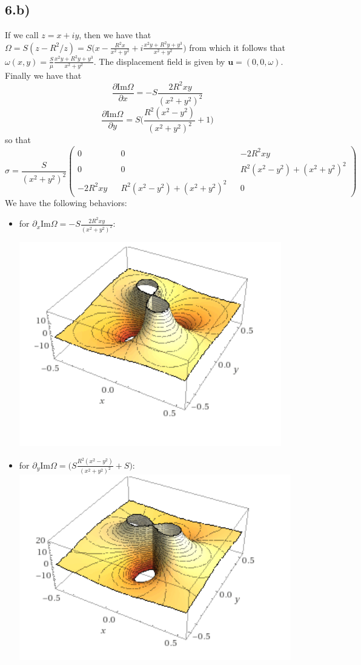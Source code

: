 \documentclass[10pt,a4paper]{book}
\begin{document}
\subsection*{6.b)}
If we call $z=x+iy$, then we have that $\Omega=S(z-R^2/z)=S\bigg(x-\frac{R^2x}{x^2+y^2}+i\frac{x^2y+R^2y+y^3}{x^2+y^2}\bigg)$ from which it follows that $\omega(x,y)=\frac{S}{\mu}\frac{x^2y+R^2y+y^3}{x^2+y^2}$. The displacement field is given by $\mathbf{u}=(0,0,\omega)$. Finally we have that 
$$\frac{\partial\text{Im}\Omega}{\partial x}=-S\frac{2R^2xy}{(x^2+y^2)^2}$$
$$\frac{\partial\text{Im}\Omega}{\partial y}=S\bigg(\frac{R^2(x^2-y^2)}{(x^2+y^2)^2}+1\bigg)$$
so that 
$$\sigma=
\frac{S}{(x^2+y^2)^2}
\begin{pmatrix}
0 && 0 && -2R^2xy\\
0 && 0 && R^2(x^2-y^2)+(x^2+y^2)^2\\
-2R^2xy && R^2(x^2-y^2)+(x^2+y^2)^2 && 0
\end{pmatrix}
$$
We have the following behaviors:
\begin{itemize}
\item for $\partial_x\text{Im}\Omega=-S\frac{2R^2xy}{(x^2+y^2)^2}$:

\includegraphics[scale=0.6]{fm1}
\item for $\partial_y\text{Im}\Omega=\bigg(S\frac{R^2(x^2-y^2)}{(x^2+y^2)^2}+S\bigg)$:
\\
\includegraphics[scale=0.6]{fm2}

\end{itemize}
\end{document}
